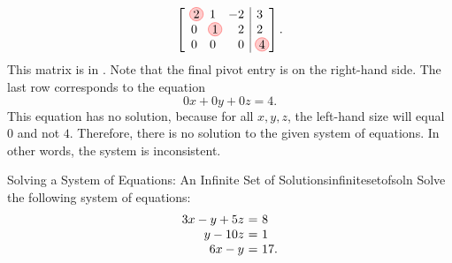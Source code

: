 \begin{solution}
  \begin{equation*}
    \leftB
    \begin{array}{rrr|r}
      \circled{2} &  1 &  -2 & 3\\
      0 &  \circled{1} &   2 & 2\\
      0 & 0 & 0 & \circled{4}
    \end{array}
    \rightB.
  \end{equation*}
  This matrix is in {\ef}. Note that the final pivot entry is on the
  right-hand side. The last row corresponds to the equation
  \begin{equation*}
    0x + 0y + 0z = 4.
  \end{equation*}
  This equation has no solution, because for all $x,y,z$, the
  left-hand size will equal $0$ and not $4$. Therefore, there is no
  solution to the given system of equations. In other words, the
  system is inconsistent.
\end{solution}

\begin{example}{Solving a System of Equations: An Infinite Set of Solutions}{infinitesetofsoln}
  Solve the following system of equations:
  \begin{equation}
    \begin{array}{r@{~}c@{~}l}
      3x  -y  +5z &=& 8 \\
           y -10z &=& 1 \\
      6x  -y      &=& 17.
    \end{array}
  \end{equation}
\end{example}

